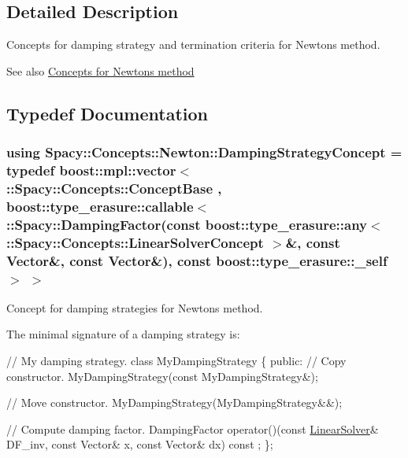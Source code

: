 \subsection{Detailed Description}
Concepts for damping strategy and termination criteria for Newton\textquotesingle{}s method. 

\begin{DoxySeeAlso}{See also}
\hyperlink{group__NewtonConceptGroup}{Concepts for Newton\textquotesingle{}s method} 
\end{DoxySeeAlso}


\subsection{Typedef Documentation}
\hypertarget{group__NewtonConceptGroup_ga8da917ba6de9c283c1509281956bb04a_ga8da917ba6de9c283c1509281956bb04a}{}
\subsubsection[{Damping\+Strategy\+Concept}]{\setlength{\rightskip}{0pt plus 5cm}using {\bf Spacy\+::\+Concepts\+::\+Newton\+::\+Damping\+Strategy\+Concept} = typedef boost\+::mpl\+::vector$<$ \+::{\bf Spacy\+::\+Concepts\+::\+Concept\+Base} , boost\+::type\+\_\+erasure\+::callable$<$ \+::{\bf Spacy\+::\+Damping\+Factor}(const boost\+::type\+\_\+erasure\+::any$<$ \+::{\bf Spacy\+::\+Concepts\+::\+Linear\+Solver\+Concept} $>$\&, const {\bf Vector}\&, const {\bf Vector}\&), const boost\+::type\+\_\+erasure\+::\+\_\+self$>$ $>$}\label{group__NewtonConceptGroup_ga8da917ba6de9c283c1509281956bb04a_ga8da917ba6de9c283c1509281956bb04a}


Concept for damping strategies for Newton\textquotesingle{}s method. 

\label{group__NewtonConceptGroup_ga8da917ba6de9c283c1509281956bb04a_Newton_DampingStrategyConceptAnchor}%
\hypertarget{group__NewtonConceptGroup_ga8da917ba6de9c283c1509281956bb04a_Newton_DampingStrategyConceptAnchor}{}%
The minimal signature of a damping strategy is\+: 
\begin{DoxyCode}
\textcolor{comment}{// My damping strategy.}
\textcolor{keyword}{class }MyDampingStrategy
\{
\textcolor{keyword}{public}:
  \textcolor{comment}{// Copy constructor.}
  MyDampingStrategy(\textcolor{keyword}{const} MyDampingStrategy&);

  \textcolor{comment}{// Move constructor.}
  MyDampingStrategy(MyDampingStrategy&&);

  \textcolor{comment}{// Compute damping factor.}
  DampingFactor operator()(\textcolor{keyword}{const} \hyperlink{namespaceSpacy_a7d5cd1c6fb9dd85aa345b536caf30bba_a7d5cd1c6fb9dd85aa345b536caf30bba}{LinearSolver}& DF\_inv, \textcolor{keyword}{const} Vector& x, \textcolor{keyword}{const} Vector& dx) \textcolor{keyword}{const}
      ;
\};
\end{DoxyCode}



